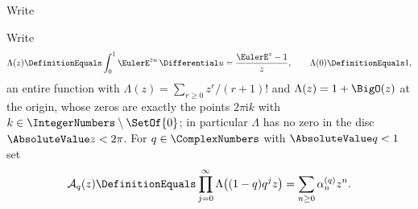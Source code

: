 \documentclass[11pt,a4paper,oneside,openany]{book}
\theoremstyle{definition}
\theoremstyle{remark}
\begin{document}
Write

Write
\begin{equation}\label{eq:uniform-mgf-kernel}
 \Lambda(z)\DefinitionEquals\int_0^1\EulerE^{zu}\,\Differential u=\frac{\EulerE^z-1}{z},
 \qquad\Lambda(0)\DefinitionEquals1,
\end{equation}
an entire function with $\Lambda(z)=\sum_{r\ge0}z^r/(r+1)!$ and $\Lambda(z)=1+\BigO(z)$ at the
origin, whose zeros are exactly the points $2\pi\mathrm ik$ with $k\in\IntegerNumbers\setminus\SetOf{0}$; in
particular $\Lambda$ has no zero in the disc $\AbsoluteValue z<2\pi$.  For $q\in\ComplexNumbers$ with $\AbsoluteValue q<1$ set
\begin{equation}\label{eq:geometric-uniform-mgf-def}
 \mathcal A_q(z)\DefinitionEquals\prod_{j=0}^{\infty}\Lambda\bigl((1-q)q^jz\bigr)
 =\sum_{n\ge0}\alpha^{(q)}_nz^n .
\end{equation}
\end{document}
